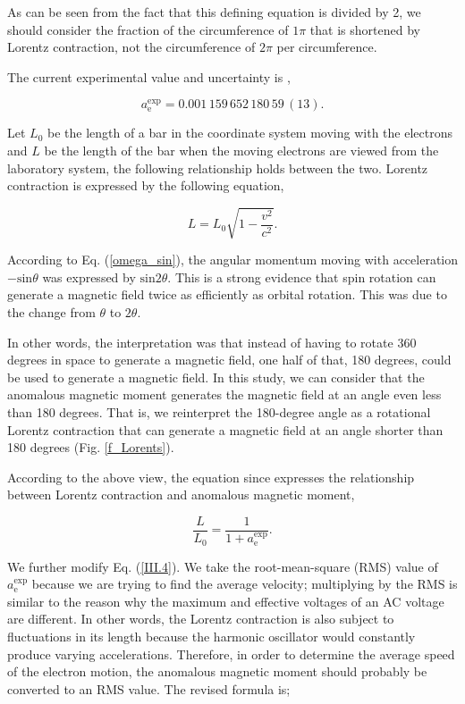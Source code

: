 \documentclass[%
 reprint,
 amsmath,amssymb,
 aps,
]{revtex4-1}
\numberwithin{equation}{section}%
\begin{document}
As can be seen from the fact that this defining equation is divided by 2, we should consider the fraction of the circumference of $1\pi$ that is shortened by Lorentz contraction, not the circumference of $2\pi$ per circumference.


The current experimental value and uncertainty is \cite{Fan},

    \begin{equation}
          {\displaystyle a^{\text{exp}}_{\text{e}}=0.001\,159\,652\,180\,59\,(13)} .
          \label{}
    \end{equation}


Let $L_0$ be the length of a bar in the coordinate system moving with the electrons and $L$ be the length of the bar when the moving electrons are viewed from the laboratory system, the following relationship holds between the two. Lorentz contraction is expressed by the following equation,


    \begin{equation}
        L = L_0 \sqrt{1 - \frac{v^2}{c^2}} .
    \end{equation}


According to Eq. (\ref{omega_sin}), the angular momentum moving with acceleration $\mathrm{-sin}\theta$ was expressed by $\mathrm{sin}2\theta$. This is a strong evidence that spin rotation can generate a magnetic field twice as efficiently as orbital rotation. This was due to the change from $\theta$ to $2\theta$.

In other words, the interpretation was that instead of having to rotate 360 degrees in space to generate a magnetic field, one half of that, 180 degrees, could be used to generate a magnetic field. In this study, we can consider that the anomalous magnetic moment generates the magnetic field at an angle even less than 180 degrees. That is, we reinterpret the 180-degree angle as a rotational Lorentz contraction that can generate a magnetic field at an angle shorter than 180 degrees (Fig. \ref{f_Lorents}).

According to the above view, the equation since expresses the relationship between Lorentz contraction and anomalous magnetic moment,

    \begin{equation}
        \frac{L}{L_0} = \frac{1}{1 + a^{\text{exp}}_{\text{e}}} .
        \label{III.4}
    \end{equation}


We further modify Eq. (\ref{III.4}). We take the root-mean-square (RMS) value of $a^{\text{exp}}_{\text{e}}$ because we are trying to find the average velocity; multiplying by the RMS is similar to the reason why the maximum and effective voltages of an AC voltage are different. In other words, the Lorentz contraction is also subject to fluctuations in its length because the harmonic oscillator would constantly produce varying accelerations. Therefore, in order to determine the average speed of the electron motion, the anomalous magnetic moment should probably be converted to an RMS value. The revised formula is;
\end{document}
